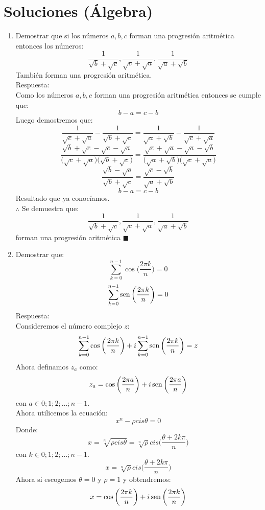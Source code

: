 \documentclass{book}
\newcommand{\sen}{\mathop{\rm sen}\nolimits} %
\begin{document}
\section{Soluciones (Álgebra)}
\begin{enumerate}
    \item Demostrar que si los números $a,b,c$ forman una progresión aritmética entonces los números:
          $$\frac{1}{\sqrt{b}+\sqrt{c}},\frac{1}{\sqrt{c}+\sqrt{a}},\frac{1}{\sqrt{a}+\sqrt{b}}$$
          También forman una progresión aritmética.\\
          Respuesta:\\
          Como los números $a,b,c$ forman una progresión aritmética entonces se cumple que:
          $$b-a=c-b$$
          Luego demostremos que:
          $$\frac{1}{\sqrt{c}+\sqrt{a}}-\frac{1}{\sqrt{b}+\sqrt{c}}=\frac{1}{\sqrt{a}+\sqrt{b}}-\frac{1}{\sqrt{c}+\sqrt{a}}$$
          $$\frac{\sqrt{b}+\sqrt{c}-\sqrt{c}-\sqrt{a}}{\big(\sqrt{c}+\sqrt{a}\big)\big(\sqrt{b}+\sqrt{c}\big)} =\frac{\sqrt{c}+\sqrt{a}-\sqrt{a}-\sqrt{b}}{\big(\sqrt{a}+\sqrt{b}\big)\big(\sqrt{c}+\sqrt{a}\big)} $$
          $$\frac{\sqrt{b}-\sqrt{a}}{\sqrt{b}+\sqrt{c}}=\frac{\sqrt{c}-\sqrt{b}}{\sqrt{a}+\sqrt{b}}$$
          $$b-a=c-b$$
          Resultado que ya conocíamos.\\
          $\therefore$ Se demuestra que:
          $$\frac{1}{\sqrt{b}+\sqrt{c}},\frac{1}{\sqrt{c}+\sqrt{a}},\frac{1}{\sqrt{a}+\sqrt{b}}$$
          forman una progresión aritmética $\blacksquare$\\
    \item Demostrar que:
          $$ \sum_{k=0}^{n-1}\cos{\bigg(\frac{2\pi k}{n}\bigg)}=0$$
          $$ \sum_{k=0}^{n-1}\sen{\bigg(\frac{2\pi k}{n}\bigg)}=0$$
          Respuesta:\\
          Consideremos el número complejo $z$:
          $$\sum_{k=0}^{n-1}\cos{\bigg(\frac{2\pi k}{n}\bigg)} +i\sum_{k=0}^{n-1}\sen{\bigg(\frac{2\pi k}{n}\bigg)} =z$$
          Ahora definamos $z_a$ como:
          $$z_a=\cos{\bigg(\frac{2\pi a}{n}\bigg)} +i\sen{\bigg(\frac{2\pi a}{n}\bigg)}$$
          con $a \in {0;1;2;…;n-1}$.\\
          Ahora utilicemos la ecuación:
          $$x^n-\rho cis\theta=0$$
          Donde:
          $$x=\sqrt[n]{\rho cis\theta}=\sqrt[n]{\rho}cis\bigg(\frac{\theta+2k\pi}{n}\bigg)$$
          con $k \in {0;1;2;…;n-1}$.
          $$x=\sqrt[n]{\rho}cis\bigg(\frac{\theta+2k\pi}{n}\bigg)$$
          Ahora si escogemos $\theta=0$ y $\rho=1$ y obtendremos:
          $$x=\cos{\bigg(\frac{2\pi k}{n}\bigg)} +i\sen{\bigg(\frac{2\pi k}{n}\bigg)}$$

\end{enumerate}
\end{document}

